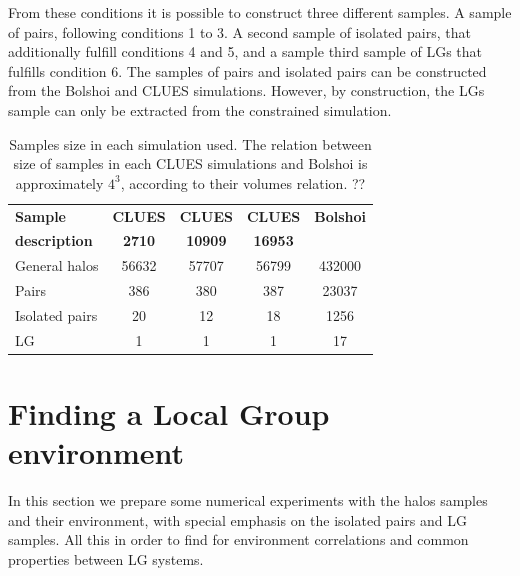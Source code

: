 \documentclass[usenatbib]{latex/mn2e}
\begin{document}
From these conditions it is possible to construct three different samples.
A sample of pairs, following conditions 1 to 3. A second sample of 
isolated pairs, that additionally fulfill conditions 4 and 5, and a sample 
third sample of LGs that fulfills condition 6. The samples of pairs and 
isolated pairs can be constructed from the Bolshoi and CLUES simulations. 
However, by construction, the LGs sample can only be extracted from the 
constrained simulation.


\begin{table}
  \centering
  \begin{tabular}{l | c c c c} \hline
	\textbf{Sample}& \textbf{CLUES} & \textbf{CLUES} & \textbf{CLUES} & \textbf{Bolshoi} \\
	\textbf{description}& \textbf{2710} & \textbf{10909} & \textbf{16953} &  \\ \hline
	General halos 	& 56632 & 57707 & 56799  & 432000 	\\
	Pairs 			& 386 	& 380 	& 387	 & 23037 	\\
	Isolated pairs	& 20 	& 12 	& 18 	 & 1256 	\\
	LG 				& 1 	& 1 	& 1 	 & 17		\\ \hline
  \end{tabular}
  
  \caption{Samples size in each simulation used. The relation between size 
  of samples in each CLUES simulations and Bolshoi is approximately $4^3$, 
  according to their volumes relation. ?? }
  
  \label{Tab:Samples}
\end{table}


\section{Finding a Local Group environment}
\label{sec:experiments}


In this section we prepare some numerical experiments with the halos 
samples and their environment, with special emphasis on the isolated pairs 
and LG samples. All this in order to find for environment correlations and 
common properties between LG systems.


\end{document}
